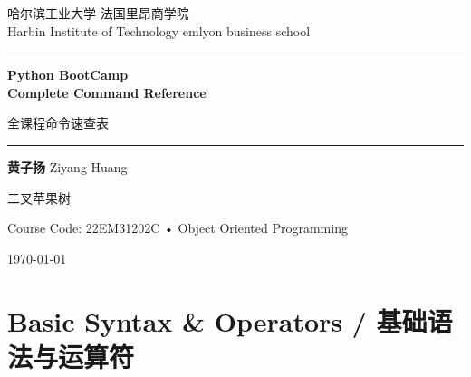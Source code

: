 \documentclass[11pt,a4paper]{report}
\begin{document}
\begin{titlepage}
\thispagestyle{empty}
\begin{center}
\vspace*{2cm}

{\large 哈尔滨工业大学 \quad 法国里昂商学院 \\ Harbin Institute of Technology \quad emlyon business school \par}

\vspace{1.5cm}
\rule{\linewidth}{0.5pt}
\vspace{1cm}

{\Huge\bfseries Python BootCamp \\[0.3em] Complete Command Reference \par}

\vspace{0.5cm}
{\LARGE 全课程命令速查表 \par}

\vspace{1cm}
\rule{\linewidth}{0.5pt}
\vspace{1.5cm}

{\Large\textbf{黄子扬} \quad Ziyang Huang \par}
\vspace{0.3em}
{\normalsize 二叉苹果树 \par}

\vfill

{\large Course Code: 22EM31202C \quad • \quad Object Oriented Programming \par}
\vspace{0.3em}
{\large \today \par}

\end{center}
\end{titlepage}

\tableofcontents
\newpage

\chapter{Basic Syntax \& Operators / 基础语法与运算符}
\end{document}
